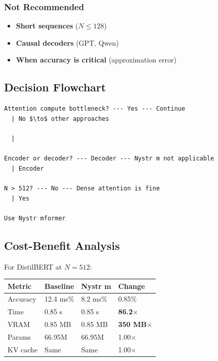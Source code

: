 \subsubsection{Not Recommended}

\begin{itemize}
\item \textbf{Short sequences} ($N \leq 128$)
\item \textbf{Causal decoders} (GPT, Qwen)
\item \textbf{When accuracy is critical} (approximation error)

\end{itemize}
\subsection{Decision Flowchart}

\begin{lstlisting}
Attention compute bottleneck? --- Yes --- Continue
  | No $\to$ other approaches

  |
   
Encoder or decoder? --- Decoder --- Nystr m not applicable
  | Encoder
   
N > 512? --- No --- Dense attention is fine
  | Yes
   
Use Nystr mformer
\end{lstlisting}

\subsection{Cost-Benefit Analysis}

For DistilBERT at $N=512$:

\begin{table}[H]
\centering
\small
\begin{tabular}{llll}
\toprule
\textbf{Metric} & \textbf{Baseline} & \textbf{Nystr m} & \textbf{Change} \\
\midrule
Accuracy & 12.4 ms\% & 8.2 ms\% & 0.85\% \\
Time & 0.85 s & 0.85 s & \textbf{86.2$\times$} \\
VRAM & 0.85 MB & 0.85 MB & \textbf{350 MB$\times$} \\
Params & 66.95M & 66.95M & 1.00$\times$ \\
KV cache & Same & Same & 1.00$\times$ \\
\bottomrule
\end{tabular}
\end{table}

